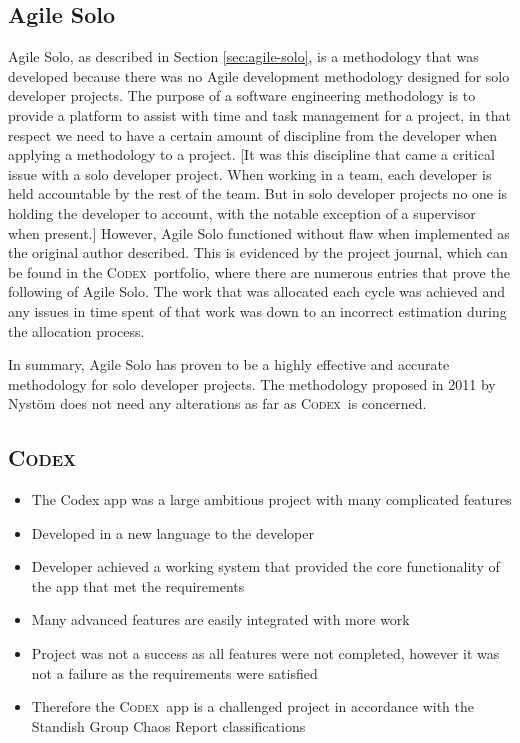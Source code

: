 \documentclass[final]{cmpreport}
\newcommand{\Codex}{\textsc{Codex}}
\begin{document}
		\subsection{Agile Solo} \label{sec:agile-solo-conc}
		Agile Solo, as described in Section \ref{sec:agile-solo}, is a methodology that was developed because there was no Agile development methodology designed for solo developer projects. The purpose of a software engineering methodology is to provide a platform to assist with time and task management for a project, in that respect we need to have a certain amount of discipline from the developer when applying a methodology to a project. [It was this discipline that came a critical issue with a solo developer project. When working in a team, each developer is held accountable by the rest of the team. But in solo developer projects no one is holding the developer to account, with the notable exception of a supervisor when present.] However, Agile Solo functioned without flaw when implemented as the original author described. This is evidenced by the project journal, which can be found in the \Codex \ portfolio, where there are numerous entries that prove the following of Agile Solo. The work that was allocated each cycle was achieved and any issues in time spent of that work was down to an incorrect estimation during the allocation process.
		
		In summary, Agile Solo has proven to be a highly effective and accurate methodology for solo developer projects. The methodology proposed in 2011 by Nyst{\"o}m does not need any alterations as far as \Codex \ is concerned.  
		
		\subsection{\Codex} \label{sec:codex-conc}
		\begin{itemize}
			\item The Codex app was a large ambitious project with many complicated features
			\item Developed in a new language to the developer
			\item Developer achieved a working system that provided the core functionality of the app that met the requirements
			\item Many advanced features are easily integrated with more work
			\item Project was not a success as all features were not completed, however it was not a failure as the requirements were satisfied
			\item Therefore the \Codex \ app is a challenged project in accordance with the Standish Group Chaos Report classifications
		\end{itemize}
	
	\clearpage	
	
\end{document}
